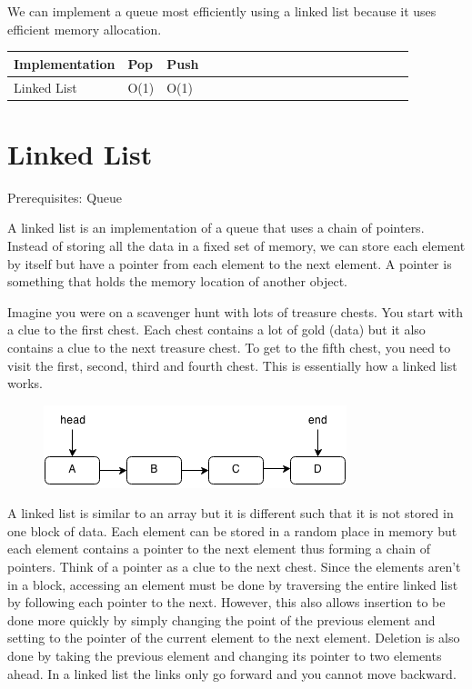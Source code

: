 \documentclass[11pt,oneside]{book}
\makeatletter
\def\maxwidth#1{\ifdim\Gin@nat@width>#1 #1\else\Gin@nat@width\fi}
\makeatother
\begin{document}
        

We can implement a queue most efficiently using a linked list because it uses efficient memory allocation.

\begin{center}\begin{tabulary}{0.4\linewidth}{|l|l|l|l|l|l|l|l|l|l|l|l|l|l|l|l|l|l|l}\hline


  Implementation &
  Pop &
  Push\\
\hline


  Linked List &
  O(1) &
  O(1)\\

\hline\end{tabulary}\end{center}


        \section{ Linked List }
        

Prerequisites: Queue



A linked list is an implementation of a queue that uses a chain of pointers. Instead of storing all the data in a fixed set of memory, we can store each element by itself but have a pointer from each element to the next element. A pointer is something that holds the memory location of another object.

Imagine you were on a scavenger hunt with lots of treasure chests. You start with a clue to the first chest. Each chest contains a lot of gold (data) but it also contains a clue to the next treasure chest. To get to the fifth chest, you need to visit the first, second, third and fourth chest. This is essentially how a linked list works.

\vspace{5px}\begin{figure}[H]\centering
        \includegraphics[width=0.66\maxwidth{\textwidth}]{linkedlist.png}
        \end{figure}

A linked list is similar to an array but it is different such that it is not stored in one block of data. Each element can be stored in a random place in memory but each element contains a pointer to the next element thus forming a chain of pointers. Think of a pointer as a clue to the next chest. Since the elements aren't in a block, accessing an element must be done by traversing the entire linked list by following each pointer to the next. However, this also allows insertion to be done more quickly by simply changing the point of the previous element and setting to the pointer of the current element to the next element. Deletion is also done by taking the previous element and changing its pointer to two elements ahead. In a linked list the links only go forward and you cannot move backward.
\end{document}
